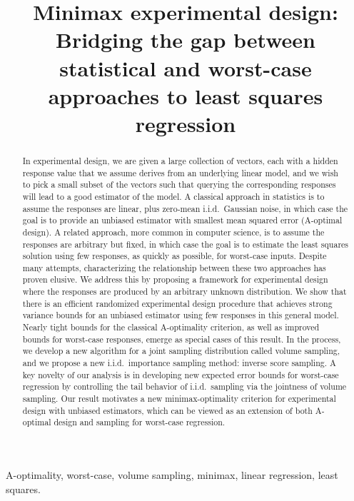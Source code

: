 \documentclass[12pt]{sty/colt2019/colt2018-arxiv}
\title[Minimax experimental design]{Minimax experimental design:
  Bridging the gap between statistical and worst-case approaches to
  least squares regression}
\begin{document}
\maketitle

\begin{abstract}%
In experimental design, we are given a large collection of vectors,
each with a hidden response value that we assume derives from an
underlying linear model, and we wish to pick a small subset of the
vectors such that querying the corresponding responses will lead to a
good estimator of the model.  
A classical approach in statistics is to assume the responses are
linear, plus zero-mean i.i.d.~Gaussian noise, in which case the goal
is to provide an unbiased estimator with smallest mean squared error
(A-optimal design).  
A related approach, more common in computer science, is to assume the
responses are arbitrary but fixed, in which case the goal is to
estimate the least squares solution using few responses, as quickly as
possible, for worst-case inputs.   
Despite many attempts, characterizing the relationship between these
two approaches has proven elusive.  
We address this by proposing a framework for experimental 
design where the responses are produced by
an arbitrary unknown distribution.  
We show that there is an efficient randomized experimental design
procedure that achieves strong variance bounds for an
unbiased estimator using few responses  in this general model.
Nearly tight bounds for the classical A-optimality criterion, as well
as improved bounds for worst-case responses, emerge as special cases
of this result.  
In the process, we develop a new algorithm for a joint sampling
distribution called volume sampling, and we propose a new
i.i.d.~importance sampling method: inverse score sampling.  
A key novelty of our analysis is in developing new expected error
bounds for worst-case regression by controlling the tail behavior of
i.i.d.~sampling via the jointness of volume sampling.  
Our result motivates a new minimax-optimality criterion for
experimental design with unbiased estimators, 
which can be viewed as an extension of both
A-optimal design and sampling for worst-case regression. 
\end{abstract}

\begin{keywords}%
  A-optimality, 
  worst-case, 
  volume sampling,  
  minimax, 
  linear regression, 
  least squares.%
\end{keywords}
\end{document}
